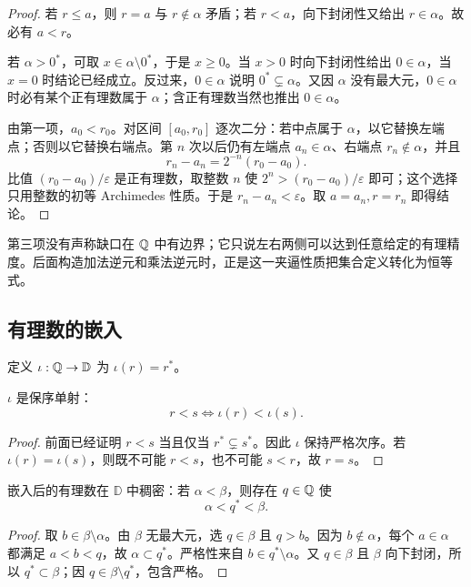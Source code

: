 \begin{proof}
若 \(r\le a\)，则 \(r=a\) 与 \(r\notin\alpha\) 矛盾；若 \(r<a\)，向下封闭性又给出 \(r\in\alpha\)。故必有 \(a<r\)。

若 \(\alpha>0^*\)，可取 \(x\in\alpha\setminus0^*\)，于是 \(x\ge0\)。当 \(x>0\) 时向下封闭性给出 \(0\in\alpha\)，当 \(x=0\) 时结论已经成立。反过来，\(0\in\alpha\) 说明 \(0^*\subsetneq\alpha\)。又因 \(\alpha\) 没有最大元，\(0\in\alpha\) 时必有某个正有理数属于 \(\alpha\)；含正有理数当然也推出 \(0\in\alpha\)。

由第一项，\(a_0<r_0\)。对区间 \([a_0,r_0]\) 逐次二分：若中点属于 \(\alpha\)，以它替换左端点；否则以它替换右端点。第 \(n\) 次以后仍有左端点 \(a_n\in\alpha\)、右端点 \(r_n\notin\alpha\)，并且
 \[
   r_n-a_n=2^{-n}(r_0-a_0).
 \]
比值 \((r_0-a_0)/\varepsilon\) 是正有理数，取整数 \(n\) 使
\(2^n>(r_0-a_0)/\varepsilon\) 即可；这个选择只用整数的初等 Archimedes 性质。于是 \(r_n-a_n<\varepsilon\)。取 \(a=a_n,r=r_n\) 即得结论。
\end{proof}

第三项没有声称缺口在 \(\mathbb{Q}\) 中有边界；它只说左右两侧可以达到任意给定的有理精度。后面构造加法逆元和乘法逆元时，正是这一夹逼性质把集合定义转化为恒等式。

\subsection{有理数的嵌入}


定义 \(\iota:\mathbb{Q}\to\mathbb D\) 为 \(\iota(r)=r^*\)。

\begin{theorem}
\(\iota\) 是保序单射：
\[
 r<s\Longleftrightarrow\iota(r)<\iota(s).
\]
\end{theorem}

\begin{proof}
前面已经证明 \(r<s\) 当且仅当 \(r^*\subsetneq s^*\)。因此 \(\iota\) 保持严格次序。若 \(\iota(r)=\iota(s)\)，则既不可能 \(r<s\)，也不可能 \(s<r\)，故 \(r=s\)。
\end{proof}

\begin{corollary}
嵌入后的有理数在 \(\mathbb D\) 中稠密：若 \(\alpha<\beta\)，则存在 \(q\in\mathbb{Q}\) 使
\[
 \alpha<q^*<\beta.
\]
\end{corollary}

\begin{proof}
取 \(b\in\beta\setminus\alpha\)。由 \(\beta\) 无最大元，选 \(q\in\beta\) 且 \(q>b\)。因为 \(b\notin\alpha\)，每个 \(a\in\alpha\) 都满足 \(a<b<q\)，故 \(\alpha\subset q^*\)。严格性来自 \(b\in q^*\setminus\alpha\)。又 \(q\in\beta\) 且 \(\beta\) 向下封闭，所以 \(q^*\subset\beta\)；因 \(q\in\beta\setminus q^*\)，包含严格。
\end{proof}

